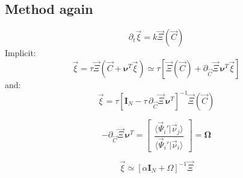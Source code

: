 \documentclass[aps,12pt]{revtex4}
\begin{document}
\subsection{Method again}

\begin{equation}
	\partial_t \vec{\xi} = k\vec{\Xi}(\vec{C})
\end{equation}
Implicit:
\begin{equation}
	\vec{\xi} = \tau \vec{\Xi}(\vec{C}+\bm{\nu}^T \vec{\xi} ) 
	\simeq \tau \left[ \vec{\Xi}(\vec{C}) + \partial_{\vec{C}}\vec{\Xi} \, \bm{\nu}^T \vec{\xi} \right]
\end{equation}
and:
\begin{equation}
	\vec{\xi} = \tau \left[ \bm{I}_N - \tau \, \partial_{\vec{C}}\vec{\Xi} \, \bm{\nu}^T \right]^{-1} \vec{\Xi}(\vec{C}) 
\end{equation}

\begin{equation}
	- \partial_{\vec{C}}\vec{\Xi} \, \bm{\nu}^T = 
	\begin{bmatrix}
		 \dfrac{\langle \vec{\Psi}_i' \vert \vec{\nu}_j \rangle}{\langle \vec{\Psi}_i' \vert \vec{\nu}_i \rangle} 	
	\end{bmatrix}
	 = \bm{\Omega}
\end{equation}

\begin{equation}
	\vec{\xi} \simeq \left[ \alpha \bm{I}_N + \Omega \right]^{-1} \vec{\Xi}
\end{equation}




 
\end{document}
